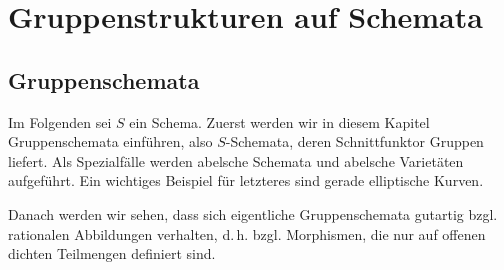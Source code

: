 \chapter{Gruppenstrukturen auf Schemata}
\label{chap:gruppenstrukturenaufschemata}
\section{Gruppenschemata}
Im Folgenden sei $S$ ein Schema.
Zuerst werden wir in diesem Kapitel Gruppenschemata einführen, also
$S$-Schemata, deren Schnittfunktor Gruppen liefert. Als Spezialfälle
werden abelsche Schemata und abelsche Varietäten aufgeführt. Ein
wichtiges Beispiel für letzteres sind gerade elliptische Kurven.

Danach werden wir sehen, dass sich eigentliche Gruppenschemata
gutartig bzgl. rationalen Abbildungen verhalten,
d.\,h. bzgl. Morphismen, die nur auf offenen dichten Teilmengen
definiert sind.

